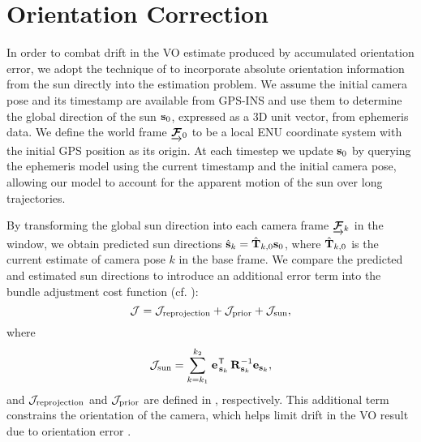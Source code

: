 \section{Orientation Correction}
In order to combat drift in the VO estimate produced by accumulated orientation error, we adopt the technique of \citet{Lambert2012-sn} to incorporate absolute orientation information from the sun directly into the estimation problem.
We assume the initial camera pose and its timestamp are available from GPS-INS  and use them to determine the global direction of the sun $\boldsymbol{\mathbf{s}}_0$, expressed as a 3D unit vector, from ephemeris data.
We define the world frame $\underrightarrow{ \boldsymbol{\mathbf{\mathcal{F}}} }_{0}$ to be a local ENU coordinate system with the initial GPS position as its origin.
At each timestep we update $\boldsymbol{\mathbf{s}}_0$ by querying the ephemeris model using the current timestamp and the initial camera pose, allowing our model to account for the apparent motion of the sun over long trajectories.

By transforming the global sun direction into each camera frame $\underrightarrow{ \boldsymbol{\mathbf{\mathcal{F}}} }_{k}$ in the window, we obtain predicted sun directions $\hat{\boldsymbol{\mathbf{s}}}_k = \hat{\boldsymbol{\mathbf{T}}}_{k,0} \boldsymbol{\mathbf{s}}_0$, where $\hat{\boldsymbol{\mathbf{T}}}_{k,0}$ is the current estimate of camera pose $k$ in the base frame. 
We compare the predicted and estimated sun directions to introduce an additional error term into the bundle adjustment cost function (cf. ):
\begin{equation} \label{eq:cost_function_with_sun}
    \mathcal{J} = \mathcal{J}_\text{reprojection} + \mathcal{J}_\text{prior} + \mathcal{J}_\text{sun},
\end{equation}
where 
\begin{equation} \label{eq:sun_cost}
	\mathcal{J}_\text{sun} = \sum_{k=k_1}^{k_2} \left.{\boldsymbol{\mathbf{e}}}\right.^{\mkern-1.0mu\mathsf{T}}_{\boldsymbol{\mathbf{s}}_k} \boldsymbol{\mathbf{R}}^{-1}_{\boldsymbol{\mathbf{s}}_k} \boldsymbol{\mathbf{e}}_{\boldsymbol{\mathbf{s}}_k},
\end{equation}
and $\mathcal{J}_\text{reprojection}$ and $\mathcal{J}_\text{prior}$ are defined in , respectively.
This additional term constrains the orientation of the camera, which helps limit drift in the VO result due to orientation error \citep{Lambert2012-sn}.

